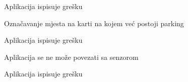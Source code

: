 \begin{packed_item}
\begin{packed_item}
\begin{packed_enum}
								\item Aplikacija ispisuje grešku
								
							\end{packed_enum}
							\item[3.a] Označavanje mjesta na karti na kojem već postoji parking
							\item[] \begin{packed_enum}
								
								\item Aplikacija ispisuje grešku
								
							\end{packed_enum}
							\item[4.a] Aplikacija se ne može povezati sa senzorom
							\item[] \begin{packed_enum}
								
								\item Aplikacija ispisuje grešku
								
							\end{packed_enum}
							
						\end{packed_item}
					\end{packed_item}
					\noindent {}
